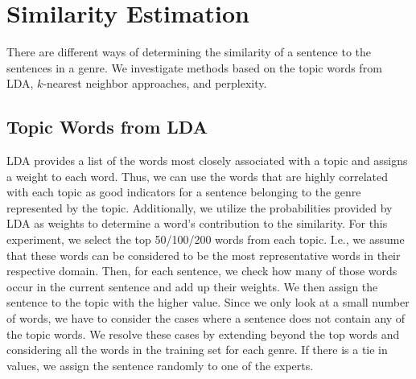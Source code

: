 



\section{Similarity Estimation}\label{sim}
   
There are different ways of determining the similarity of a sentence to the sentences in a genre. We investigate methods based on the topic words from LDA, $k$-nearest neighbor approaches, and  perplexity.

\subsection{Topic Words from LDA}


LDA provides a list of the words most closely associated with a topic and assigns a weight to each word.  Thus, we can use the words that are highly correlated with each topic as good indicators for a sentence belonging to the genre represented by the topic. Additionally, we utilize the probabilities provided by LDA as weights to determine a word's contribution to the similarity. For this experiment, we select the top 50/100/200 words from each topic. I.e., we assume that these words can be considered to be the most representative  words in their respective domain. Then, for each sentence, we check how many of those words occur in the current sentence and add up their weights. 
We then assign the sentence to the topic with the higher value. Since we only look at a small number of words, we have to consider the cases where a sentence does not contain any of the topic words. We resolve these cases by extending beyond the top  words and considering all the words in the training set for each genre. If there is a tie in values, we assign the sentence randomly to one of the experts. 

